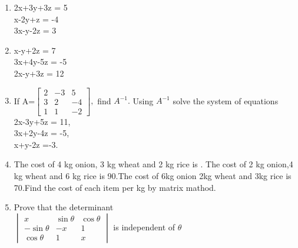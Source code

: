 \documentclass[journal,12pt,twocolumn]{IEEEtran}
\renewcommand\thesection{\arabic{section}}
\begin{document}
\begin{enumerate}[label=\thesection.\arabic*.,ref=\thesection.\theenumi]
\item 2x+3y+3z = 5 \\ x-2y+z = -4 \\ 3x-y-2z = 3\\
\item x-y+2z = 7 \\ 3x+4y-5z = -5 \\ 2x-y+3z = 12\\ 
\item If A=$\begin{bmatrix}
2&-3&5 \\ 3&2&-4 \\ 1&1&-2
\end{bmatrix},$ find $A^{-1}.$ Using $A^{-1}$ solve the system of equations \\
2x-3y+5z = 11, \\ 3x+2y-4z = -5, \\ x+y-2z =-3.\\
\item The cost of 4 kg onion, 3 kg wheat and 2 kg rice is . The cost of 2 kg onion,4 kg wheat and 6 kg rice is \rupee 90.The cost of 6kg onion 2kg wheat and 3kg rice is \rupee 70.Find the cost of each item per kg by matrix mathod. 
\item Prove that the determinant \\
$\begin{vmatrix}
x &\sin\theta&\cos\theta \\ -\sin\theta&-x&1 \\ \cos\theta&1&x
\end{vmatrix}$ 
is independent of $\theta$
\\
\solution 



\end{enumerate}
\end{document}
